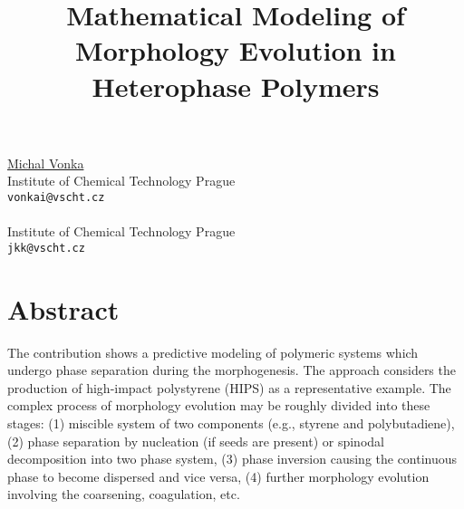 \title{Mathematical Modeling of Morphology Evolution in Heterophase Polymers}
 \author{} \institute{}
\maketitle
\begin{center}
{\large \underline{Michal Vonka}}\\
Institute of Chemical Technology Prague\\
{\tt vonkai@vscht.cz}
\\ \vspace{4mm}{\large Juraj Kosek}\\
Institute of Chemical Technology Prague\\
{\tt jkk@vscht.cz}

\end{center}

\section*{Abstract}

The contribution shows a predictive modeling of polymeric systems which undergo phase separation during the morphogenesis. The approach considers the production of high-impact polystyrene (HIPS) as a representative example. The complex process of morphology evolution may be roughly divided into these stages: (1) miscible system of two components (e.g., styrene and polybutadiene), (2) phase separation by nucleation (if seeds are present) or spinodal decomposition into two phase system, (3) phase inversion causing the continuous phase to become dispersed and vice versa, (4) further morphology evolution involving the coarsening, coagulation, etc. 

